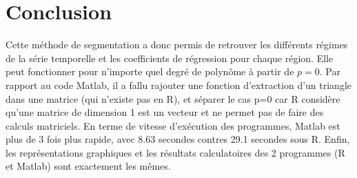 \documentclass[12pt]{article}
\begin{document}
\section{Conclusion}
\label{sec:Conclusion}
Cette méthode de segmentation a donc permis de retrouver les différents régimes de la série temporelle et les coefficients de régression pour chaque région. Elle peut fonctionner pour n'importe quel degré de polynôme à partir de $p=0$. Par rapport au code Matlab, il a fallu rajouter une fonction d'extraction d'un triangle dans une matrice (qui n'existe pas en R), et séparer le cas p=0 car R considère qu'une matrice de dimension 1 est un vecteur et ne permet pas de faire des calculs matriciels. En terme de vitesse d'exécution des programmes, Matlab est plus de 3 fois plus rapide, avec 8.63 secondes contres 29.1 secondes sous R. Enfin, les représentations graphiques et les résultats calculatoires des 2 programmes (R et Matlab) sont exactement les mêmes.


\newpage


\end{document}
